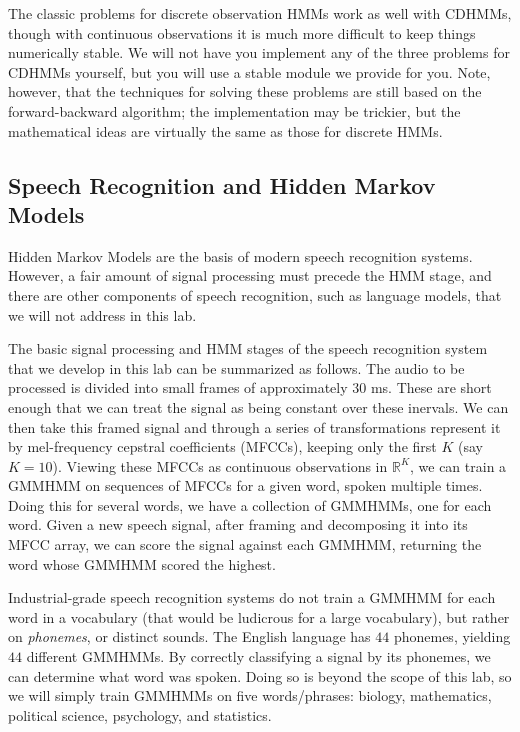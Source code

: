 The classic problems for discrete observation HMMs work as well with CDHMMs, though with continuous observations it is much more difficult to keep things numerically stable.
We will not have you implement any of the three problems for CDHMMs yourself, but you will use a stable module we provide for you.
Note, however, that the techniques for solving these problems are still based on the forward-backward algorithm; the implementation may be trickier, but the mathematical
ideas are virtually the same as those for discrete HMMs.

\subsection*{Speech Recognition and Hidden Markov Models}
Hidden Markov Models are the basis of modern speech recognition systems. However, a fair amount of signal processing must precede the HMM stage, and there are other
components of speech recognition, such as language models, that we will not address in this lab.

The basic signal processing and HMM stages of the speech recognition system that we develop in this lab can be summarized as follows.
The audio to be processed is divided into small frames of approximately $30$ ms. These are short enough that we can treat the signal as being constant over these inervals. We can then take this framed signal and through a series of transformations represent it by mel-frequency cepstral coefficients (MFCCs), keeping only the first $K$ (say $K = 10$). Viewing these MFCCs as continuous observations in $\mathbb{R}^{K}$, we can train a GMMHMM on sequences of MFCCs for a given word, spoken multiple times. Doing this for several words, we have a collection of GMMHMMs, one for each word. Given a new speech signal, after framing and decomposing it into its MFCC array, we can score the signal against each GMMHMM, returning the word whose GMMHMM scored the highest.

Industrial-grade speech recognition systems do not train a GMMHMM for each word in a vocabulary (that would be ludicrous for a large vocabulary), but rather on \emph{phonemes}, or distinct sounds. The English language has $44$ phonemes, yielding $44$ different GMMHMMs. By correctly classifying a signal by its phonemes, we can determine what word was spoken. Doing so is beyond the scope of this lab, so we will simply train GMMHMMs on five words/phrases: biology, mathematics, political science, psychology, and statistics.

